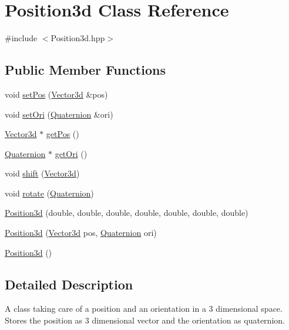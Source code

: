 \hypertarget{classPosition3d}{}\section{Position3d Class Reference}
\label{classPosition3d}


{\ttfamily \#include $<$Position3d.\+hpp$>$}

\subsection*{Public Member Functions}
\begin{DoxyCompactItemize}
\item 
void \hyperlink{classPosition3d_affe1574abc035f3d7586be496d87ec9b}{set\+Pos} (\hyperlink{structVector3d}{Vector3d} \&pos)
\item 
void \hyperlink{classPosition3d_ae80dba5689430944acafac6d51280f51}{set\+Ori} (\hyperlink{structQuaternion}{Quaternion} \&ori)
\item 
\hyperlink{structVector3d}{Vector3d} $\ast$ \hyperlink{classPosition3d_a4e9f764486d20a713596e7d4324f16f4}{get\+Pos} ()
\item 
\hyperlink{structQuaternion}{Quaternion} $\ast$ \hyperlink{classPosition3d_a57d5c31102109a08d42d2046074e6223}{get\+Ori} ()
\item 
void \hyperlink{classPosition3d_a2e0467a0caca224952bdd0a300cbe816}{shift} (\hyperlink{structVector3d}{Vector3d})
\item 
void \hyperlink{classPosition3d_afcbb1fe0cffcaae431822d44a3579f90}{rotate} (\hyperlink{structQuaternion}{Quaternion})
\item 
\hyperlink{classPosition3d_ab53bf1ffb4ca8e0f4ca6be7d05235600}{Position3d} (double, double, double, double, double, double, double)
\item 
\hyperlink{classPosition3d_a2cc343559bbf48523c343dee350c2aaa}{Position3d} (\hyperlink{structVector3d}{Vector3d} pos, \hyperlink{structQuaternion}{Quaternion} ori)
\item 
\hyperlink{classPosition3d_a0295a79fb99a32b699f366f5f2e5a331}{Position3d} ()
\end{DoxyCompactItemize}


\subsection{Detailed Description}
A class taking care of a position and an orientation in a 3 dimensional space. Stores the position as 3 dimensional vector and the orientation as quaternion. 

